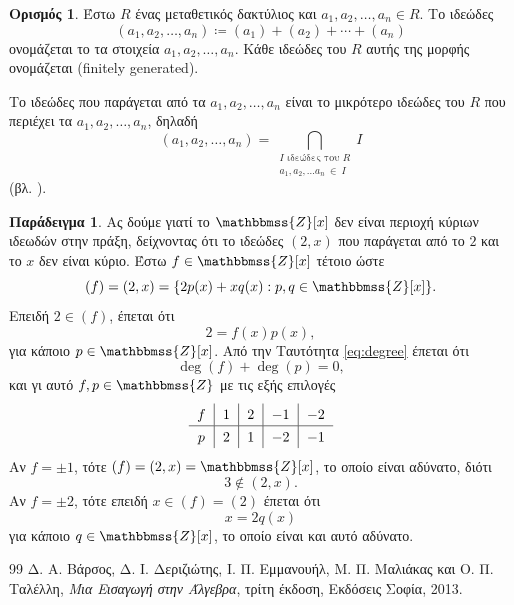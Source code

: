 \documentclass[12pt,a4paper,reqno]{amsart}
\theoremstyle{definition}
\newtheorem{definition}[theorem]{Ορισμός}
\newtheorem{example}[theorem]{Παράδειγμα}
\theoremstyle{remark}
\numberwithin{theorem}{section}
\numberwithin{exercise}{section}
\numberwithin{equation}{section}
\newcommand{\ZZ}{\mathbbmss{Z}}
\newcommand{\defn}[1]{{\color{mylightblue}{#1}}}
\begin{document}
\begin{definition}
    \label{def:ideals_generated_by}
    Έστω $R$ ένας μεταθετικός δακτύλιος και $a_1, a_2, \dots, a_n \in R$. Το ιδεώδες 
    \[
    (a_1, a_2, \dots, a_n) \coloneqq (a_1) + (a_2) + \cdots + (a_n)
    \]
    ονομάζεται το \defn{ιδεώδες που παράγεται από} τα στοιχεία $a_1, a_2, \dots, a_n$. Κάθε ιδεώδες του $R$ αυτής της μορφής ονομάζεται \defn{πεπερασμένα παραγόμενο} (finitely generated).
\end{definition}

Το ιδεώδες που παράγεται από τα $a_1, a_2, \dots, a_n$ είναι το μικρότερο ιδεώδες του $R$ που περιέχει τα $a_1, a_2, \dots, a_n$, δηλαδή 
\[
(a_1, a_2, \dots, a_n) = \bigcap_{\substack{\text{$I$ ιδεώδες του $R$} \\ a_1, a_2, \dots a_n \ \in \ I}} I
\]
(βλ. \cite[Πρόταση~2.5.9]{VDEMT13}). 

\begin{example}
    \label{ex:Z[x]_is_not_a_PID}
    Ας δούμε γιατί το $\ZZ[x]$ δεν είναι περιοχή κύριων ιδεωδών στην πράξη, δείχνοντας ότι το ιδεώδες $(2, x)$ που παράγεται από το $2$ και το $x$ δεν είναι κύριο. Έστω $f \in \ZZ[x]$ τέτοιο ώστε 
    \[
    (f) = (2, x) = \{2p(x) + xq(x) : p, q \in \ZZ[x]\}.
    \]
    Επειδή $2 \in (f)$, έπεται ότι 
    \[
    2 = f(x)p(x),
    \]
    για κάποιο $p \in \ZZ[x]$. Από την Ταυτότητα \eqref{eq:degree} έπεται ότι 
    \[
    \deg(f) + \deg(p) = 0,
    \]
    και γι αυτό $f, p \in \ZZ$ με τις εξής επιλογές
    \[
    \renewcommand{\arraystretch}{1.3} 
    \begin{tabular}{c|c|c|c|c}
    $f$ & $1$ & $2$ & $-1$ & $-2$\\ \hline
    $p$ & $2$ & $1$ & $-2$ & $-1$
    \end{tabular}
    \]
    Αν $f = \pm 1$, τότε $(f) = (2,x) = \ZZ[x]$, το οποίο είναι αδύνατο, διότι 
    \[
    3 \notin (2, x).
    \]
    Αν $f = \pm 2$, τότε επειδή $x \in (f) = (2)$ έπεται ότι 
    \[
    x = 2q(x)
    \]
    για κάποιο $q \in \ZZ[x]$, το οποίο είναι και αυτό αδύνατο. 
\end{example}


\begin{thebibliography}{99}
    Δ. Α. Βάρσος, Δ. Ι. Δεριζιώτης, Ι. Π. Εμμανουήλ, Μ. Π. Μαλιάκας και Ο. Π. Ταλέλλη, 
    \emph{Μια Εισαγωγή στην Άλγεβρα}, 
    τρίτη έκδοση, Εκδόσεις Σοφία, 2013.
\end{thebibliography}
\end{document}
